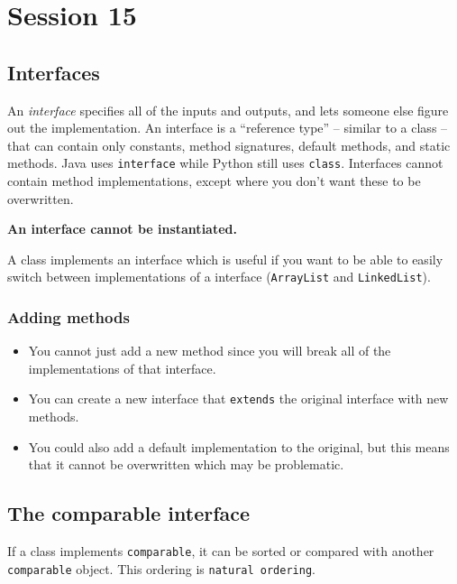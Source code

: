 \section{Session 15}\label{sec:session_15}

\subsection{Interfaces}\label{sub:interfaces}

An \emph{interface} specifies all of the inputs and outputs, and lets someone else figure out the implementation.
An interface is a ``reference type'' -- similar to a class -- that can contain only constants, method signatures, default methods, and static methods.
Java uses \texttt{interface} while Python still uses \texttt{class}.
Interfaces cannot contain method implementations, except where you don't want these to be overwritten.

\textbf{An interface cannot be instantiated.}

A class implements an interface which is useful if you want to be able to easily switch between implementations of a interface (\texttt{ArrayList} and \texttt{LinkedList}).

\subsubsection{Adding methods}\label{ssub:adding_methods}

\begin{itemize}
    \item You cannot just add a new method since you will break all of the implementations of that interface.
    \item You can create a new interface that \texttt{extends} the original interface with new methods.
    \item You could also add a default implementation to the original, but this means that it cannot be overwritten which may be problematic.
\end{itemize}

\subsection{The comparable interface}\label{sub:the_comparable_interface}

If a class implements \texttt{comparable}, it can be sorted or compared with another \texttt{comparable} object.
This ordering is \texttt{natural ordering}.

